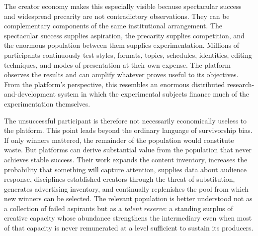 \documentclass[11pt]{article}
\begin{document}
The creator economy makes this especially visible because spectacular success and widespread precarity are not contradictory observations. They can be complementary components of the same institutional arrangement. The spectacular success supplies aspiration, the precarity supplies competition, and the enormous population between them supplies experimentation. Millions of participants continuously test styles, formats, topics, schedules, identities, editing techniques, and modes of presentation at their own expense. The platform observes the results and can amplify whatever proves useful to its objectives. From the platform's perspective, this resembles an enormous distributed research-and-development system in which the experimental subjects finance much of the experimentation themselves.

The unsuccessful participant is therefore not necessarily economically useless to the platform. This point leads beyond the ordinary language of survivorship bias. If only winners mattered, the remainder of the population would constitute waste. But platforms can derive substantial value from the population that never achieves stable success. Their work expands the content inventory, increases the probability that something will capture attention, supplies data about audience response, disciplines established creators through the threat of substitution, generates advertising inventory, and continually replenishes the pool from which new winners can be selected. The relevant population is better understood not as a collection of failed aspirants but as a \emph{talent reserve}: a standing surplus of creative capacity whose abundance strengthens the intermediary even when most of that capacity is never remunerated at a level sufficient to sustain its producers.
\end{document}
